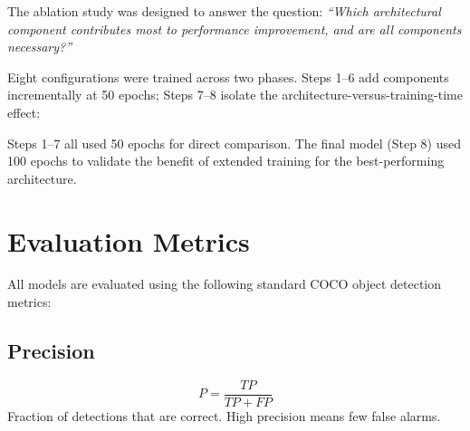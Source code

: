 The ablation study was designed to answer the question: \textit{``Which architectural component contributes most to performance improvement, and are all components necessary?''}

Eight configurations were trained across two phases. Steps 1--6 add components incrementally at 50 epochs; Steps 7--8 isolate the architecture-versus-training-time effect:

\begin{table}[H]
\centering
\caption{Ablation Study Experimental Configurations}
\label{tab:ablation_design}
\end{table}

Steps 1--7 all used 50 epochs for direct comparison. The final model (Step 8) used 100 epochs to validate the benefit of extended training for the best-performing architecture.

\section{Evaluation Metrics}

All models are evaluated using the following standard COCO object detection metrics:

\subsection{Precision}
\begin{equation}
P = \frac{TP}{TP + FP}
\end{equation}
Fraction of detections that are correct. High precision means few false alarms.

